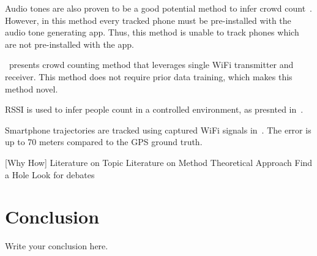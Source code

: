 \documentclass{article}
\begin{document}
Audio tones are also proven to be a good potential method to infer crowd count~\cite{thesis044}. However, in this method every tracked phone must be pre-installed with the audio tone generating app. Thus, this method is unable to track phones which are not pre-installed with the app.

\cite{thesis051}~presents crowd counting method that leverages single WiFi transmitter and receiver. This method does not require prior data training, which makes this method novel.

RSSI is used to infer people count in a controlled environment, as presnted in~\cite{thesis052}. 

Smartphone trajectories are tracked using captured WiFi signals in~\cite{thesis058}. The error is up to 70 meters compared to the GPS ground truth.

\cite{thesis048}

[Why How]
Literature on Topic
Literature on Method
Theoretical Approach
Find a Hole
Look for debates

\section{Conclusion}
Write your conclusion here.

{}

\end{document}

